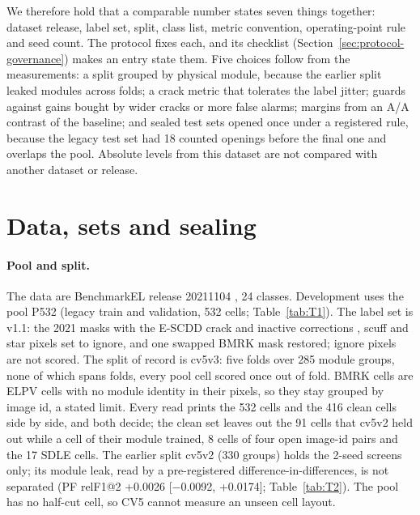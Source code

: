We therefore hold that a comparable number states seven things together: dataset release, label set, split, class list, metric
convention, operating-point rule and seed count. The protocol fixes each, and its checklist (Section~\ref{sec:protocol-governance})
makes an entry state them. Five choices follow from the measurements: a split grouped by physical module, because the earlier split
leaked modules across folds; a crack metric that tolerates the label jitter; guards against gains bought by wider cracks or more false
alarms; margins from an A/A contrast of the baseline; and sealed test sets opened once under a registered rule, because the legacy
test set had 18 counted openings before the final one and overlaps the pool. Absolute levels from this dataset are not compared with another dataset or
release.

\section{Data, sets and sealing}
\label{sec:protocol-sets}

\paragraph{Pool and split.} The data are BenchmarkEL release 20211104 \citep{pratt2021unet,pratt2023benchmark}, 24 classes.
Development uses the pool P532 (legacy train and validation, 532 cells; Table~\ref{tab:T1}). The label set is v1.1: the 2021 masks
with the E-SCDD crack and inactive corrections \citep{hanifi2025escdd}, scuff and star pixels set to ignore, and
one swapped BMRK mask restored; ignore pixels are not scored. The split of record is cv5v3: five folds over 285 module groups, none
of which spans folds, every pool cell scored once out of fold. BMRK cells are ELPV cells \citep{deitsch2019elpv} with no module
identity in their pixels, so they stay grouped by image id, a stated limit. Every read prints the 532 cells and the 416 clean cells
side by side, and both decide; the clean set leaves out the 91 cells that cv5v2 held out while a cell of their module trained, 8
cells of four open image-id pairs and the 17 SDLE cells. The earlier split cv5v2 (330 groups) holds the 2-seed screens only; its
module leak, read by a pre-registered difference-in-differences, is not separated (PF relF1@2 +0.0026 [$-$0.0092, +0.0174];
Table~\ref{tab:T2}). The pool has no half-cut cell, so CV5 cannot measure an unseen cell layout.

